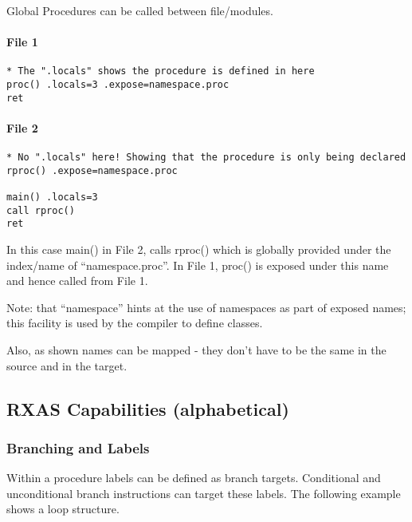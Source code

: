 Global Procedures can be called between file/modules.

\hypertarget{file-1-1}{%
\paragraph{File 1}\label{file-1-1}}

\begin{verbatim}
* The ".locals" shows the procedure is defined in here
proc() .locals=3 .expose=namespace.proc
ret
\end{verbatim}

\hypertarget{file-2-1}{%
\paragraph{File 2}\label{file-2-1}}

\begin{verbatim}
* No ".locals" here! Showing that the procedure is only being declared 
rproc() .expose=namespace.proc

main() .locals=3 
call rproc()
ret
\end{verbatim}

In this case main() in File 2, calls rproc() which is globally provided
under the index/name of ``namespace.proc''. In File 1, proc() is exposed
under this name and hence called from File 1.

Note: that ``namespace'' hints at the use of namespaces as part of
exposed names; this facility is used by the compiler to define classes.

Also, as shown names can be mapped - they don't have to be the same in
the source and in the target.

\hypertarget{rxas-capabilities-alphabetical}{%
\subsection{RXAS Capabilities
(alphabetical)}\label{rxas-capabilities-alphabetical}}

\hypertarget{branching-and-labels}{%
\subsubsection{Branching and Labels}\label{branching-and-labels}}

Within a procedure labels can be defined as branch targets. Conditional
and unconditional branch instructions can target these labels. The
following example shows a loop structure.

